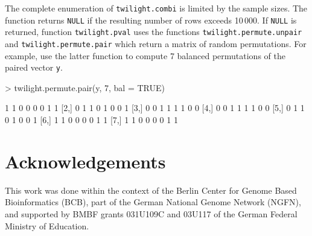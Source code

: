 \documentclass[11pt,a4paper,fleqn]{report}
\newcommand{\Rfunction}[1]{{\texttt{#1}}}
\newcommand{\Rfunarg}[1]{{\texttt{#1}}}
\begin{document}
The complete enumeration of \Rfunction{twilight.combi} is limited by the sample sizes. The function returns \Rfunarg{NULL} if the resulting number of rows exceeds 10\,000. If \Rfunarg{NULL} is returned, function \Rfunction{twilight.pval} uses the functions \Rfunction{twilight.permute.unpair} and \Rfunction{twilight.permute.pair} which return a matrix of random permutations. For example, use the latter function to compute 7 balanced permutations of the paired vector \Rfunarg{y}.
\begin{Schunk}
\begin{Sinput}
> twilight.permute.pair(y, 7, bal = TRUE)
\end{Sinput}
\begin{Soutput}
     [,1] [,2] [,3] [,4] [,5] [,6] [,7] [,8]
[1,]    1    1    0    0    0    0    1    1
[2,]    0    1    1    0    1    0    0    1
[3,]    0    0    1    1    1    1    0    0
[4,]    0    0    1    1    1    1    0    0
[5,]    0    1    1    0    1    0    0    1
[6,]    1    1    0    0    0    0    1    1
[7,]    1    1    0    0    0    0    1    1
\end{Soutput}
\end{Schunk}


\section*{Acknowledgements}

This work was done within the context of the Berlin Center for Genome Based Bioinformatics (BCB), part of the German National Genome Network (NGFN), and supported by BMBF grants 031U109C and 03U117 of the German Federal Ministry of Education.
\end{document}
